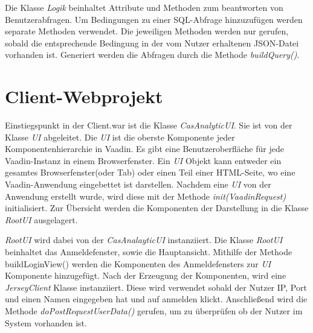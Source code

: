 Die Klasse \textit{Logik} beinhaltet Attribute und Methoden zum beantworten von Benutzerabfragen. Um Bedingungen zu einer SQL-Abfrage hinzuzufügen werden separate Methoden verwendet. Die jeweiligen Methoden werden nur gerufen, sobald die entsprechende Bedingung in der vom Nutzer erhaltenen JSON-Datei vorhanden ist. Generiert werden die Abfragen durch die Methode \textit{buildQuery()}. 

\section{Client-Webprojekt}
\label{ch:Umsetzung:sec:clientwar}

Einstiegspunkt in der Client.war ist die Klasse \textit{CasAnalyticUI}. Sie ist von der Klasse \textit{UI} abgeleitet. Die \textit{UI} ist die oberste Komponente jeder Komponentenhierarchie in Vaadin. Es gibt eine Benutzeroberfläche für jede Vaadin-Instanz in einem Browserfenster. Ein \textit{UI} Objekt kann entweder ein gesamtes Browserfenster(oder Tab) oder einen Teil einer HTML-Seite, wo eine Vaadin-Anwendung eingebettet ist darstellen. Nachdem eine \textit{UI} von der Anwendung erstellt wurde, wird diese mit der Methode \textit{init(VaadinRequest)} initialisiert. Zur Übersicht werden die Komponenten der Darstellung in die Klasse \textit{RootUI} ausgelagert. 

\textit{RootUI} wird dabei von der \textit{CasAnalayticUI} instanziiert. Die Klasse \textit{RootUI} beinhaltet das Anmeldefenster, sowie die Hauptansicht. Mithilfe der Methode buildLoginView() werden die Komponenten des Anmeldefensters zur \textit{UI} Komponente hinzugefügt. Nach der Erzeugung der Komponenten, wird eine \textit{JerseyClient} Klasse instanziiert. Diese wird verwendet sobald der Nutzer IP, Port und einen Namen eingegeben hat und auf anmelden klickt. Anschließend wird die Methode \textit{doPostRequestUserData()} gerufen, um zu überprüfen ob der Nutzer im System vorhanden ist. 

